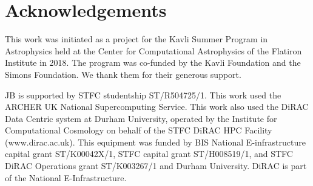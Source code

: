 \section{Acknowledgements}
\label{sec:acknowledgements}

This work was initiated as a project for the Kavli Summer Program in
Astrophysics held at the Center for Computational Astrophysics of the
Flatiron Institute in 2018. The program was co-funded by the Kavli Foundation
and the Simons Foundation. We thank them for their generous support.

JB is supported by STFC studentship ST/R504725/1. This work used the ARCHER
UK National Supercomputing Service. This work also used the DiRAC Data
Centric system at Durham University, operated by the Institute for
Computational Cosmology on behalf of the STFC DiRAC HPC Facility
(www.dirac.ac.uk). This equipment was funded by BIS National E-infrastructure
capital grant ST/K00042X/1, STFC capital grant ST/H008519/1, and STFC DiRAC
Operations grant ST/K003267/1 and Durham University. DiRAC is part of the
National E-Infrastructure.